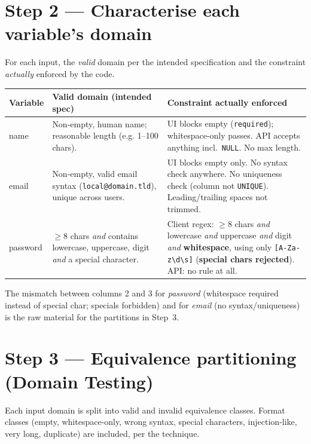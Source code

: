 \documentclass[11pt,a4paper]{article}
\begin{document}
\section{Step 2 --- Characterise each variable's domain}
\label{sec:domains}
For each input, the \emph{valid} domain per the intended specification and the constraint
\emph{actually} enforced by the code.

\begin{center}
\begin{tabular}{L{2.3cm} L{6.2cm} L{6.4cm}}
\toprule
\textbf{Variable} & \textbf{Valid domain (intended spec)} & \textbf{Constraint actually enforced} \\
\midrule
name     & Non-empty, human name; reasonable length (e.g. 1--100 chars). & UI blocks empty (\texttt{required}); whitespace-only passes. API accepts anything incl.\ \texttt{NULL}. No max length. \\
email    & Non-empty, valid email syntax (\texttt{local@domain.tld}), unique across users. & UI blocks empty only. No syntax check anywhere. No uniqueness check (column not \texttt{UNIQUE}). Leading/trailing spaces not trimmed. \\
password & $\ge 8$ chars \emph{and} contains lowercase, uppercase, digit \emph{and} a special character. & Client regex: $\ge 8$ chars \emph{and} lowercase \emph{and} uppercase \emph{and} digit \emph{and} \textbf{whitespace}, using only \verb|[A-Za-z\d\s]| (\textbf{special chars rejected}). API: no rule at all. \\
\bottomrule
\end{tabular}
\end{center}

\noindent The mismatch between columns 2 and 3 for \emph{password} (whitespace required
instead of special char; specials forbidden) and for \emph{email} (no syntax/uniqueness)
is the raw material for the partitions in Step~3.

\section{Step 3 --- Equivalence partitioning (Domain Testing)}
\label{sec:ec}
Each input domain is split into valid and invalid equivalence classes. Format classes
(empty, whitespace-only, wrong syntax, special characters, injection-like, very long,
duplicate) are included, per the technique.
\end{document}
